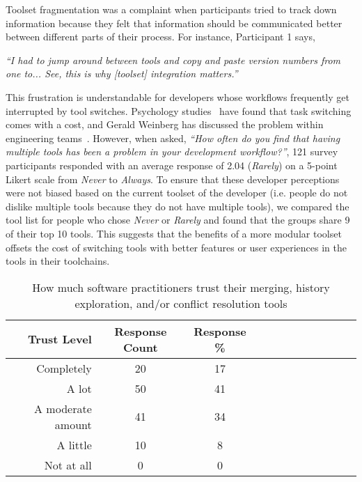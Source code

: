 
Toolset fragmentation was a complaint when participants tried to track down information because they felt that information should be communicated better between different parts of their process. For instance, Participant 1 says, 

\begin{displayquote}
\textit{``I had to jump around between tools and copy and paste version numbers from one to... See, this is why [toolset] integration matters.''}
\end{displayquote}

This frustration is understandable for developers whose workflows frequently get interrupted by tool switches. Psychology studies~\cite{Meiran2000}\cite{gopher2000switching} have found that task switching comes with a cost, and Gerald Weinberg has discussed the problem within engineering teams~\cite{Weinberg1992}. However, when asked, \textit{``How often do you find that having multiple tools has been a problem in your development workflow?''}, 121 survey participants responded with an average response of 2.04 (\textit{Rarely}) on a 5-point Likert scale from \textit{Never} to \textit{Always}. To ensure that these developer perceptions were not biased based on the current toolset of the developer (i.e. people do not dislike multiple tools because they do not have multiple tools), we compared the tool list for people who chose \textit{Never} or \textit{Rarely} and found that the groups share 9 of their top 10 tools. This suggests that the benefits of a more modular toolset offsets the cost of switching tools with better features or user experiences in the tools in their toolchains. 


\begin{table}[!]
\renewcommand{\arraystretch}{1.3}
\caption{How much software practitioners trust their merging, history exploration, and/or conflict resolution tools}
\label{survey_tool_trust}
\centering
\begin{tabularx}{0.45\textwidth}{@{}r|*{10}{C}c@{}}
\toprule
Trust Level & Response Count & Response \%\\
\midrule
Completely & 20 & 17\\
A lot & 50 & 41\\
A moderate amount & 41 & 34\\
A little & 10 & 8\\
Not at all & 0 & 0\\
\bottomrule
\end{tabularx}
\end{table}

